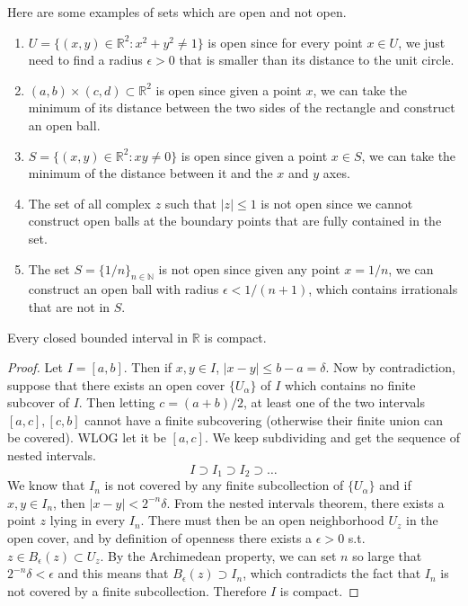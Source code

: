   \begin{example}
    \label{ex:examples-of-open-and-not-open-sets}
    Here are some examples of sets which are open and not open. 
    \begin{enumerate}
      \item $U=\{(x,y)\in \mathbb{R}^2 : x^2+y^2 \neq 1\}$ is open since for every point $x \in U$, we just need to find a radius $\epsilon > 0$ that is smaller than its distance to the unit circle. 
      \item $(a, b) \times (c, d) \subset \mathbb{R}^2$ is open since given a point $x$, we can take the minimum of its distance between the two sides of the rectangle and construct an open ball. 
      \item $S=\{(x,y)\in \mathbb{R}^2:xy\neq 0\}$ is open since given a point $x \in S$, we can take the minimum of the distance between it and the $x$ and $y$ axes. 
      \item The set of all complex $z$ such that $|z| \leq 1$ is not open since we cannot construct open balls at the boundary points that are fully contained in the set. 
      \item The set $S = \{1/n\}_{n \in \mathbb{N}}$ is not open since given any point $x = 1/n$, we can construct an open ball with radius $\epsilon < 1/(n+1)$, which contains irrationals that are not in $S$. 
    \end{enumerate}
  \end{example}

  \begin{corollary}
    \label{thm:closed-bounded-intervals-are-compact}
    Every closed bounded interval in $\mathbb{R}$ is compact. 
  \end{corollary}
  \begin{proof}
    Let $I = [a, b]$. Then if $x, y \in I$, $|x - y| \leq b - a = \delta$. Now by contradiction, suppose that there exists an open cover $\{U_\alpha\}$ of $I$ which contains no finite subcover of $I$. Then letting $c = (a + b)/2$, at least one of the two intervals $[a, c], [c, b]$ cannot have a finite subcovering (otherwise their finite union can be covered). WLOG let it be $[a, c]$. We keep subdividing and get the sequence of nested intervals. 
    \begin{equation}
      I \supset I_1 \supset I_2 \supset \ldots 
    \end{equation}
    We know that $I_n$ is not covered by any finite subcollection of $\{U_\alpha\}$ and if $x, y \in I_n$, then $|x - y| < 2^{-n} \delta$. From the nested intervals theorem, there exists a point $z$ lying in every $I_n$. There must then be an open neighborhood $U_z$ in the open cover, and by definition of openness there exists a $\epsilon > 0$ s.t. $z \in B_\epsilon (z) \subset U_z$. By the Archimedean property, we can set $n$ so large that $2^{-n} \delta < \epsilon$ and this means that $B_\epsilon (z) \supset I_n$, which contradicts the fact that $I_n$ is not covered by a finite subcollection. Therefore $I$ is compact. 
  \end{proof}


